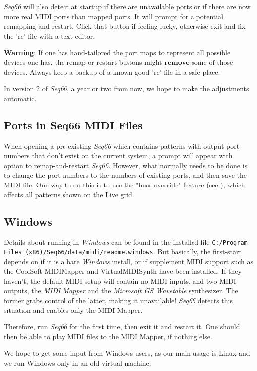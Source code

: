    \textsl{Seq66} will also detect at startup if there are unavailable
   ports or if there are now more real MIDI ports than mapped ports.
   It will prompt for a potential remapping and restart.
   Click that button if feeling lucky, otherwise
   exit and fix the 'rc' file with a text editor.

   \textbf{Warning}:
   If one has hand-tailored the port maps to represent all possible devices one
   has, the remap or restart buttons might \textbf{remove}
   some of those devices.
   Always keep a backup of a known-good 'rc' file in a safe place.

   In version 2 of \textsl{Seq66}, a year or two from now, we hope to make
   the adjustments automatic.

\subsection{Ports in Seq66 MIDI Files}
\label{subsec:introduction_ports}

   When opening a pre-existing \textsl{Seq66} which contains patterns with
   output port numbers that don't exist on the current system, a prompt
   will appear with option to remap-and-restart \textsl{Seq66}.
   However, what normally needs to be done is to change the
   port numbers to the numbers of existing ports, and then save the MIDI file.
   One way to do this is to use the "buss-override" feature
   (see ),
   which affects all patterns shown on the Live grid.

\subsection{Windows}
\label{subsec:introduction_windows}

   Details about running in \textsl{Windows} can be found in the installed file
   \texttt{C:/Program Files (x86)/Seq66/data/midi/readme.windows}.
   But basically, the first-start depends on if it is a bare \textsl{Windows}
   install, or if supplement MIDI support such as 
   the CoolSoft MIDIMapper and VirtualMIDISynth have been installed.
   If they haven't, the default MIDI setup will contain no MIDI inputs,
   and two MIDI outputs, the \textsl{MIDI Mapper} and the
   \textsl{Microsoft GS Wavetable} synthesizer.
   The former grabs control of the latter, making it unavailable!
   \textsl{Seq66} detects this situation and enables only the MIDI Mapper.

   Therefore, run \textsl{Seq66} for the first time, then exit it and
   restart it. One should then be able to play MIDI files to the MIDI Mapper,
   if nothing else.

   We hope to get some input from Windows users, as our main usage is Linux
   and we run Windows only in an old virtual machine.

